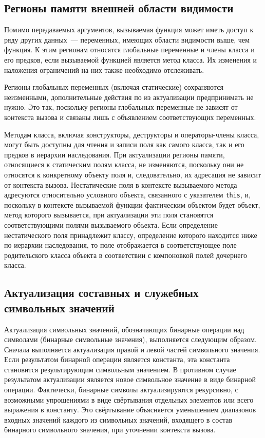 \subsection{Регионы памяти внешней области видимости}

Помимо передаваемых аргументов, вызываемая функция может иметь доступ к ряду других данных~--- переменных, имеющих области видимости выше, чем функция. К этим регионам относятся глобальные переменные и члены класса и его предков, если вызываемой функцией является метод класса. Их изменения и наложения ограничений на них также необходимо отслеживать.

Регионы глобальных переменных (включая статические) сохраняются неизменными, дополнительные действия по из актуализации предпринимать не нужно. Это так, поскольку регионы глобальных переменные не зависят от контекста вызова и связаны лишь с объявлением соответствующих переменных.

Методам класса, включая конструкторы, деструкторы и операторы-члены класса, могут быть доступны для чтения и записи поля как самого класса, так и его предков в иерархии наследования. При актуализации регионы памяти, относящиеся к статическим полям класса, не изменяются, поскольку они не относятся к конкретному объекту поля и, следовательно, их адресация не зависит от контекста вызова. Нестатические поля в контексте вызываемого метода адресуются относительно условного объекта, связанного с указателем \texttt{this}, и, поскольку в контексте вызываемой функции фактическим объектом будет объект, метод которого вызывается, при актуализации эти поля становятся соответствующими полями вызываемого объекта. Если определение нестатического поля принадлежит классу, определение которого находится ниже по иерархии наследования, то поле отображается в соответствующее поле родительского класса объекта в соответствии с компоновкой полей дочернего класса.

\subsection{Актуализация составных и служебных символьных значений}

Актуализация символьных значений, обозначающих бинарные операции над символами (бинарные символьные значения), выполняется следующим образом. Сначала выполняется актуализация правой и левой частей символьного значения. Если результатом бинарной операции является константа, эта константа становится результирующим символьным значением. В противном случае результатом актуализации является новое символьное значение в виде бинарной операции. Фактически, бинарные символы актуализируются рекурсивно, с возможными упрощениями в виде свёртывания отдельных элементов или всего выражения в константу. Это свёртывание объясняется уменьшением диапазонов входных значений каждого из символьных значений, входящего в состав бинарного символьного значения, при уточнении контекста вызова.

